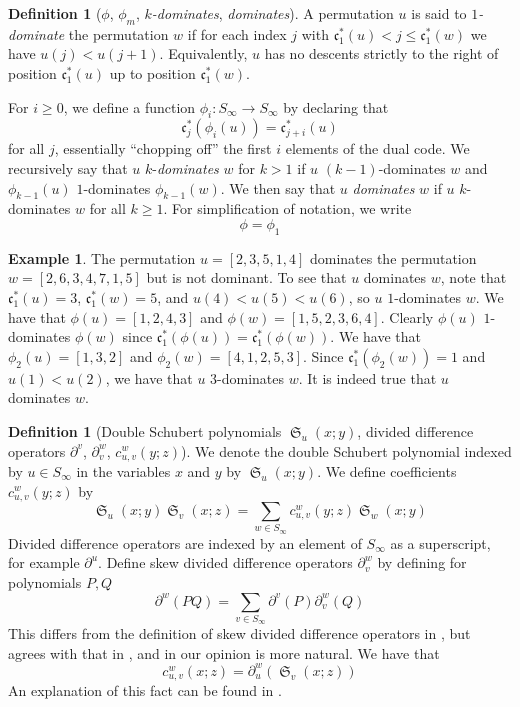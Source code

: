 \documentclass[reqno]{amsart}
\theoremstyle{definition}
\newtheorem{definition}[lemma]{Definition}
\newtheorem{example}[lemma]{Example}
\theoremstyle{remark}
\numberwithin{equation}{subsection}
\DeclareMathOperator{\sch}{\mathfrak{S}}
\newcommand{\code}{\mathfrak{c}}
\begin{document}
	\begin{definition}[$\phi$, $\phi_m$, \emph{$k$-dominates}, \emph{dominates}] \label{definition:domination}
		A permutation $u$ is said to \emph{$1$-dominate} the permutation $w$ if for each index $j$ with $\code_1^*(u)<j\leq \code_1^*(w)$ we have $u(j)<u(j+1)$. Equivalently, $u$ has no descents strictly to the right of position $\code_1^*(u)$ up to position $\code_1^*(w)$. 
		
		For $i\geq 0$, we define a function $\phi_i:S_\infty\to S_\infty$ by declaring that
		$$\code^*_j(\phi_i(u))=\code^*_{j+i}(u)$$
		for all $j$, essentially ``chopping off'' the first $i$ elements of the dual code. We recursively say that $u$ $k$-\emph{dominates} $w$ for $k>1$ if $u$ $(k-1)$-dominates $w$ and $\phi_{k-1}(u)$ $1$-dominates $\phi_{k-1}(w)$. We then say that $u$ \emph{dominates} $w$ if $u$ $k$-dominates $w$ for all $k\geq 1$. For simplification of notation, we write
		$$\phi=\phi_1$$
	\end{definition}
	
	
	\begin{example}
		The permutation $u=[2,3,5,1,4]$ dominates the permutation $w=[2,6,3,4,7,1,5]$ but is not dominant. To see that $u$ dominates $w$, note that $\code_1^*(u)=3$, $\code_1^*(w)=5$, and $u(4)<u(5)<u(6)$, so $u$ $1$-dominates $w$. We have that $\phi(u)=[1,2,4,3]$ and $\phi(w)=[1,5,2,3,6,4]$. Clearly $\phi(u)$ $1$-dominates $\phi(w)$ since $\code_1^*(\phi(u))=\code_1^*(\phi(w))$. We have that $\phi_2(u)=[1,3,2]$ and $\phi_2(w)=[4,1,2,5,3]$. Since $\code_1^*(\phi_2(w))=1$ and $u(1)<u(2)$, we have that $u$ $3$-dominates $w$. It is indeed true that $u$ dominates $w$.
	\end{example}
	
	
	
	\begin{definition}[Double Schubert polynomials $\sch_u(x;y)$, divided difference operators $\partial^v$, $\partial_v^w$, $c_{u,v}^w(y;z)$] \label{definition:schubert}
		We denote the double Schubert polynomial indexed by $u\in S_\infty$ in the variables $x$ and $y$ by $\sch_u(x;y)$. We define coefficients $c_{u,v}^w(y;z)$ by
		$$\sch_u(x;y)\sch_v(x;z)=\sum_{w\in S_\infty} c_{u,v}^w(y;z)\sch_w(x;y)$$
		Divided difference operators are indexed by an element of $S_\infty$ as a superscript, for example $\partial^u$. Define skew divided difference operators $\partial_v^w$ by defining for polynomials $P,Q$
		$$\partial^w(PQ)=\sum_{v\in S_\infty}\partial^v(P)\partial_v^w(Q)$$
		This differs from the definition of skew divided difference operators in \cite{notes}, but agrees with that in \cite{samuelleibniz}, and in our opinion is more natural. We have that
		$$c_{u,v}^w(x;z)=\partial_u^w(\sch_v(x;z))$$
		An explanation of this fact can be found in \cite{samuelmolev}.
	\end{definition}
	
\end{document}
